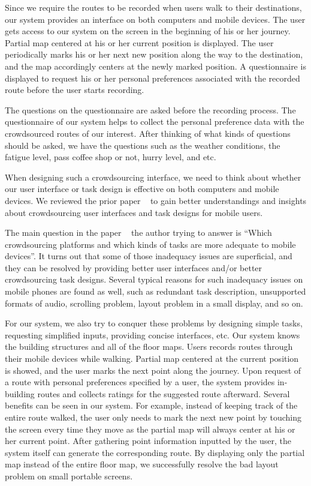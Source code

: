 \documentclass{sigchi}
\begin{document}
Since we require the routes to be recorded when users walk to their destinations, our system provides an interface on both computers and mobile devices. The user gets access to our system on the screen in the beginning of his or her journey. Partial map centered at his or her current position is displayed. The user periodically marks his or her next new position along the way to the destination, and the map accordingly centers at the newly marked position. A questionnaire is displayed to request his or her personal preferences associated with the recorded route before the user starts recording.


The questions on the questionnaire are asked before the recording process. The questionnaire of our system helps to collect the personal preference data with the crowdsourced routes of our interest. After thinking of what kinds of questions should be asked, we have the questions such as the weather conditions, the fatigue level, pass coffee shop or not, hurry level, and etc.


When designing such a crowdsourcing interface, we need to think about whether our user interface or task design is effective on both computers and mobile devices. We reviewed the prior paper ~\cite{della2013crowdsourcing} to gain better understandings and insights about crowdsourcing user interfaces and task designs for mobile users.


The main question in the paper ~\cite{della2013crowdsourcing} the author trying to answer is “Which crowdsourcing platforms and which kinds of tasks are more adequate to mobile devices”. It turns out that some of those inadequacy issues are superficial, and they can be resolved by providing better user interfaces and/or better crowdsourcing task designs. Several typical reasons for such inadequacy issues on mobile phones are found as well, such as redundant task description, unsupported formats of audio, scrolling problem, layout problem in a small display, and so on.  


For our system, we also try to conquer these problems by designing simple tasks, requesting simplified inputs, providing concise interfaces, etc. Our system knows the building structures and all of the floor maps. Users records routes through their mobile devices while walking. Partial map centered at the current position is showed, and the user marks the next point along the journey. Upon request of a route with personal preferences specified by a user, the system provides in-building routes and collects ratings for the suggested route afterward. Several benefits can be seen in our system. For example, instead of keeping track of the entire route walked, the user only needs to mark the next new point by touching the screen every time they move as the partial map will always center at his or her current point. After gathering point information inputted by the user, the system itself can generate the corresponding route. By displaying only the partial map instead of the entire floor map, we successfully resolve the bad layout problem on small portable screens.
\end{document}
